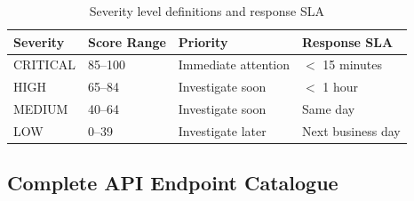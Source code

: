 \documentclass[12pt,a4paper]{article}
\begin{document}
\begin{table}[H]
\centering
\caption{Severity level definitions and response SLA}
\begin{tabular}{llll}
\toprule
\textbf{Severity} & \textbf{Score Range} & \textbf{Priority} & \textbf{Response SLA} \\
\midrule
CRITICAL & 85--100 & Immediate attention & $<$ 15 minutes \\
HIGH     & 65--84  & Investigate soon   & $<$ 1 hour \\
MEDIUM   & 40--64  & Investigate soon   & Same day \\
LOW      & 0--39   & Investigate later  & Next business day \\
\bottomrule
\end{tabular}
\end{table}

\subsection{Complete API Endpoint Catalogue}
\end{document}
